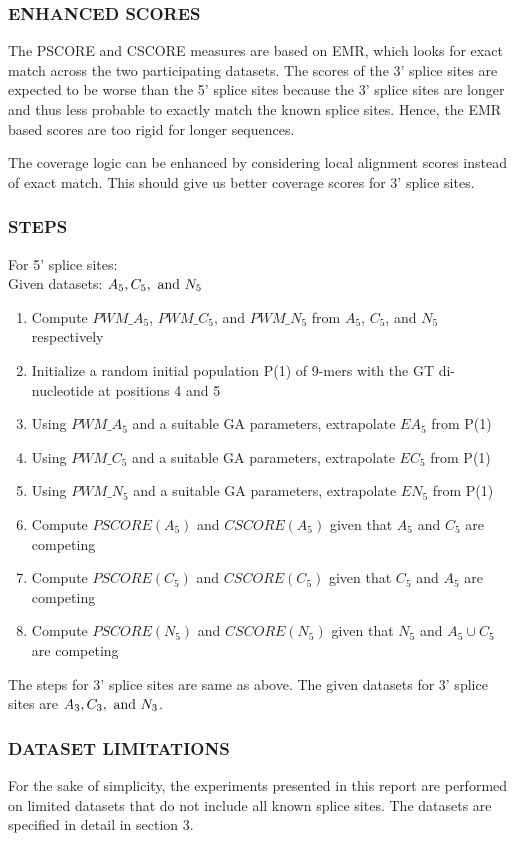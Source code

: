 \documentclass[12pt,a4paper]{article}
\begin{document}
	\subsubsection{ENHANCED SCORES} \label{score-enhanced}
	The PSCORE and CSCORE measures are based on EMR, which looks for exact match across the two participating datasets. The scores of the 3' splice sites are expected to be worse than the 5' splice sites because the 3' splice sites are longer and thus less probable to exactly match the known splice sites. Hence, the EMR based scores are too rigid for longer sequences. \par
	The coverage logic can be enhanced by considering local alignment scores instead of exact match. This should give us better coverage scores for 3' splice sites.
		
	\subsubsection{STEPS} \label{sec:steps}
	For 5' splice sites:\\
	Given datasets: $A_5, C_5,\textnormal{ and }N_5$
	\begin{enumerate}
		\item Compute $PWM\_A_5$, $PWM\_C_5$, and $PWM\_N_5$ from $A_5$, $C_5$, and $N_5$ respectively
		\item Initialize a random initial population P(1) of 9-mers with the GT di-nucleotide at positions 4 and 5
		\item Using $PWM\_A_5$ and a suitable GA parameters, extrapolate $EA_5$ from P(1)
		\item Using $PWM\_C_5$ and a suitable GA parameters, extrapolate $EC_5$ from P(1)
		\item Using $PWM\_N_5$ and a suitable GA parameters, extrapolate $EN_5$ from P(1)
		\item Compute $PSCORE(A_5)$ and $CSCORE(A_5)$ given that $A_5$ and $C_5$ are competing
		\item Compute $PSCORE(C_5)$ and $CSCORE(C_5)$ given that $C_5$ and $A_5$ are competing
		\item Compute $PSCORE(N_5)$ and $CSCORE(N_5)$ given that $N_5$ and $A_5 \cup C_5$ are competing
	\end{enumerate}
	
	The steps for 3' splice sites are same as above. The given datasets for 3' splice sites are $A_3, C_3,\textnormal{ and }N_3$.
	
	\subsubsection{DATASET LIMITATIONS}
	For the sake of simplicity, the experiments presented in this report are performed on limited datasets that do not include all known splice sites. The datasets are specified in detail in section 3.
	
\end{document}
